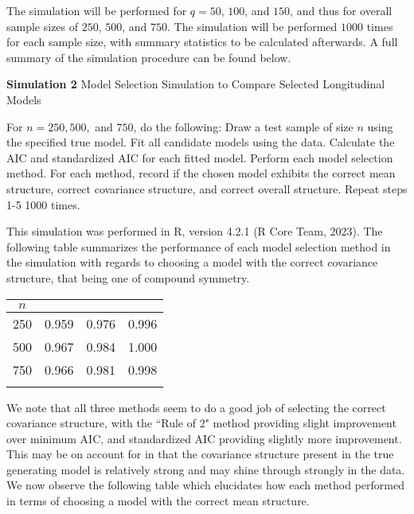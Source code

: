 		The simulation will be performed for $q = 50$, $100$, and $150$, and thus for overall sample sizes of $250$, $500$, and $750$. The simulation will be performed $1000$ times for each sample size,
		with summary statistics to be calculated afterwards. A full summary of the simulation procedure can be found below.
		\begin{algorithm}[H]
			\caption*{\textbf{Simulation 2} Model Selection Simulation to Compare Selected Longitudinal Models}
			\begin{algorithmic}[1]
			  \Statex For $n = 250, 500,$ and $750$, do the following:
			  \State Draw a test sample of size $n$ using the specified true model.
			  \State Fit all candidate models using the data.
			  \State Calculate the AIC and standardized AIC for each fitted model.
			  \State Perform each model selection method.
			  \State For each method, record if the chosen model exhibits the correct mean structure, correct covariance structure, and correct overall structure.
			  \State Repeat steps 1-5 1000 times.
			\end{algorithmic}
		\end{algorithm}

		This simulation was performed in R, version 4.2.1 (R Core Team, 2023). The following table summarizes the performance of each model selection method in the simulation with
		regards to choosing a model with the correct covariance structure, that being one of compound symmetry.

		\begin{table}[H]
			\centering
			\small\addtolength{\tabcolsep}{-3pt}
			\setlength\extrarowheight{-3pt}
			{
			\begin{tabular}{ c|c|c|c}
			$n$ & \vtop{\hbox{\strut Minimum AIC}\hbox{\strut Accuracy}} & \vtop{\hbox{\strut AIC Rule of 2}\hbox{\strut Accuracy}} & \vtop{\hbox{\strut Standardized AIC}\hbox{\strut Accuracy}} \\
			 \hline
			 250 & 0.959  &  0.976 &  0.996 \\
			 500 & 0.967  &  0.984 &  1.000 \\
			 750 & 0.966  &  0.981 &  0.998 \\
			 \Xhline{3\arrayrulewidth}
			\end{tabular}
			}
		\end{table}

		We note that all three methods seem to do a good job of selecting the correct covariance structure, with the ``Rule of 2" method providing slight improvement over minimum AIC, and
		standardized AIC providing slightly more improvement. This may be on account for in that the covariance structure present in the true generating model is relatively strong and may
		shine through strongly in the data. We now observe the following table which elucidates how each method performed in terms of choosing a model with the correct mean structure.

